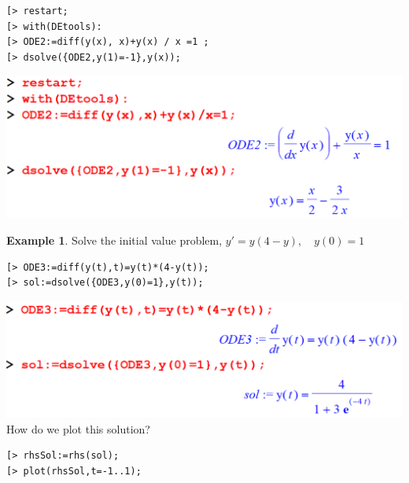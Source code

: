 \documentclass[
]{book}
\theoremstyle{definition}
\theoremstyle{definition}
\newtheorem{example}{Example}[chapter]
\theoremstyle{definition}
\theoremstyle{definition}
\theoremstyle{remark}
\begin{document}
\begin{verbatim}
[> restart;
[> with(DEtools):
[> ODE2:=diff(y(x), x)+y(x) / x =1 ;
[> dsolve({ODE2,y(1)=-1},y(x));
\end{verbatim}

\includegraphics{figures/Diff/Diff 6.2 -9.png}

\begin{example}
\protect\hypertarget{exm:unnamed-chunk-51}{}\label{exm:unnamed-chunk-51}Solve the initial value problem, \(y' = y(4 - y), \quad y(0) = 1\)
\end{example}

\begin{verbatim}
[> ODE3:=diff(y(t),t)=y(t)*(4-y(t));
[> sol:=dsolve({ODE3,y(0)=1},y(t));
\end{verbatim}

\includegraphics{figures/Diff/Diff 6.2 -10.png}
How do we plot this solution?

\begin{verbatim}
[> rhsSol:=rhs(sol);
[> plot(rhsSol,t=-1..1);
\end{verbatim}
\end{document}
